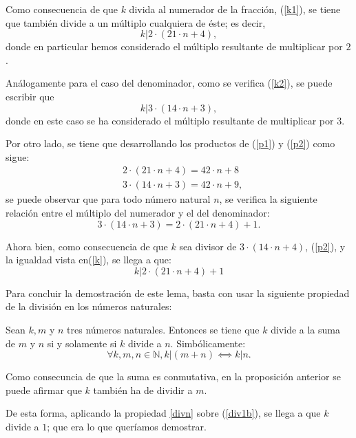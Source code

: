 \begin{demostracion}
  Como consecuencia de que \(k\) divida al numerador de la fracción,
  (\ref{k1}), se tiene que también divide a un múltiplo cualquiera de
  éste; es decir,
  \begin{equation}\label{p1}
    k | 2⋅(21⋅n+4),
  \end{equation}
  donde en particular hemos considerado el múltiplo resultante de
  multiplicar por \(2\).

  Análogamente para el caso del denominador, como se verifica
  (\ref{k2}), se puede escribir que
  \begin{equation}\label{p2}
    k | 3⋅(14⋅n+3),
  \end{equation}
  donde en este caso se ha considerado el múltiplo resultante de
  multiplicar por \(3\).

  Por otro lado, se tiene que desarrollando los productos de (\ref{p1}) y
  (\ref{p2}) como sigue:
  \begin{align}
    & 2⋅(21⋅n+4)=42⋅n+8    \\
    & 3·(14·n+3)=42·n+9,
  \end{align}
  se puede observar que para todo número natural \(n\), se verifica la
  siguiente relación entre el múltiplo del numerador y el del denominador:
  \begin{equation}\label{k}
    3⋅(14⋅n+3)=2⋅(21⋅n+4)+1.
  \end{equation}

  Ahora bien, como consecuencia de que \(k\) sea divisor de
  \(3⋅(14⋅n+4)\), (\ref{p2}), y la igualdad vista en(\ref{k}), se llega
  a que:
  \begin{equation}\label{div1b}
    k | 2⋅(21⋅n+4)+1
  \end{equation}

  Para concluir la demostración de este lema, basta con usar la siguiente
  propiedad de la división en los números naturales:

  \begin{proposicion}\label{divn}
    Sean \(k,m\) y \(n\) tres números naturales. Entonces se tiene que
    \(k\) divide a la suma de \(m\) y \(n\) si y solamente si \(k\)
    divide a \(n\). Simbólicamente:
    \begin{equation}
      ∀k,m,n ∈ ℕ, k | (m+n) ⟺ k|n.
    \end{equation}
  \end{proposicion}


  \begin{nota}
    Como consecuncia de que la suma es conmutativa, en la proposición
    anterior se puede afirmar que \(k\) también ha de dividir a \(m\).
  \end{nota}

  De esta forma, aplicando la propiedad \ref{divn} sobre (\ref{div1b}),
  se llega a que \(k\) divide a \(1\); que era lo que queríamos demostrar.
\end{demostracion}

